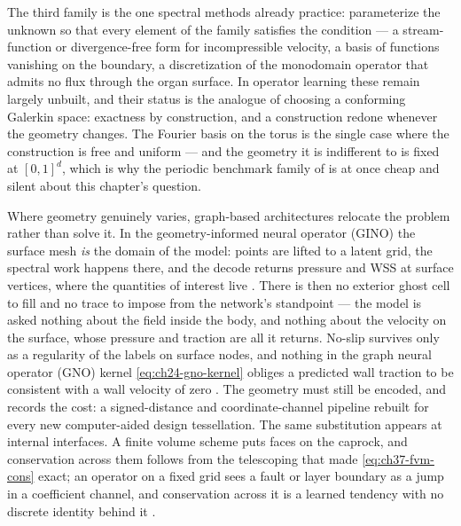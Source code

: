 The third family is the one spectral methods already practice: parameterize the unknown so that
every element of the family satisfies the condition --- a stream-function or divergence-free form for
incompressible velocity, a basis of functions vanishing on the boundary, a discretization of the
monodomain operator that admits no flux through the organ surface. In operator learning these remain
largely unbuilt, and their status is the analogue of choosing a conforming Galerkin space: exactness
by construction, and a construction redone whenever the geometry changes. The Fourier basis on the
torus is the single case where the construction is free and uniform --- and the geometry it is
indifferent to is fixed at $[0,1]^d$, which is why the periodic benchmark family of
 is at once cheap and silent about this
chapter's question.

Where geometry genuinely varies, graph-based architectures relocate the problem rather than solve it.
In the geometry-informed neural operator (GINO) the surface mesh \emph{is} the domain of the model:
points are lifted to a latent grid, the spectral work happens there, and the decode returns pressure
and WSS at surface vertices, where the quantities of interest live
\cite{li2023geometry}. There is
then no exterior ghost cell to fill and no trace to impose from the network's standpoint --- the model
is asked nothing about the field inside the body, and nothing about the velocity on the surface,
whose pressure and traction are all it returns. No-slip survives only as a regularity of the labels
on surface nodes, and nothing in the graph neural operator (GNO) kernel \eqref{eq:ch24-gno-kernel}
obliges a predicted wall traction to be consistent with a wall velocity of zero
. The geometry must still be encoded, and
 records the cost: a signed-distance and
coordinate-channel pipeline rebuilt for every new computer-aided design tessellation. The same
substitution appears at internal interfaces. A finite volume scheme puts faces on the caprock, and
conservation across them follows from the telescoping that made \eqref{eq:ch37-fvm-cons} exact; an
operator on a fixed grid sees a fault or layer boundary as a jump in a coefficient channel, and
conservation across it is a learned tendency with no discrete identity behind it
.

